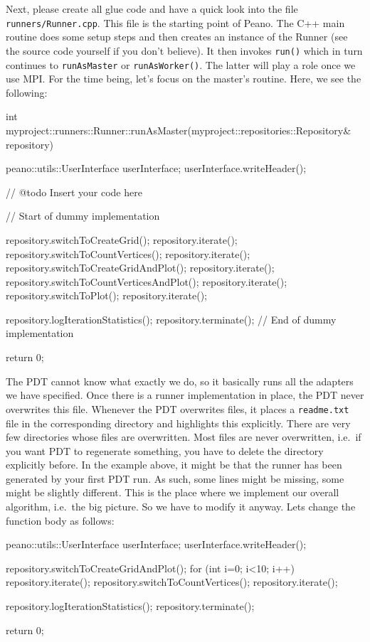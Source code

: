 \noindent
Next, please create all glue code and have a quick look into the file
\texttt{runners/Runner.cpp}.
This file is the starting point of Peano.
The C++ main routine does some setup steps and then creates an instance of the
Runner (see the source code yourself if you don't believe).
It then invokes \texttt{run()} which in turn continues to \texttt{runAsMaster}
or \texttt{runAsWorker()}.
The latter will play a role once we use MPI.
For the time being, let's focus on the master's routine.
Here, we see the following:

\begin{code}
int myproject::runners::Runner::runAsMaster(myproject::repositories::Repository& repository) {
  peano::utils::UserInterface userInterface;
  userInterface.writeHeader();

  // @todo Insert your code here
  
  // Start of dummy implementation
  
  repository.switchToCreateGrid(); repository.iterate();
  repository.switchToCountVertices(); repository.iterate();
  repository.switchToCreateGridAndPlot(); repository.iterate();
  repository.switchToCountVerticesAndPlot(); repository.iterate();
  repository.switchToPlot(); repository.iterate();
 
  repository.logIterationStatistics();
  repository.terminate();
  // End of dummy implementation

  return 0;
}
\end{code}

\noindent
The PDT cannot know what exactly we do, so it basically runs all the adapters we
have specified.
Once there is a runner implementation in place, the PDT never overwrites this
file.
Whenever the PDT overwrites files, it places a \texttt{readme.txt} file in the
corresponding directory and highlights this explicitly.
There are very few directories whose files are overwritten.
Most files are never overwritten, i.e.~if you want PDT to regenerate something,
you have to delete the directory explicitly before.
In the example above, it might be that the runner has been generated by your
first PDT run.
As such, some lines might be missing, some might be slightly different.
This is the place where we implement our overall algorithm,
i.e.~the big picture.
So we have to modify it anyway.
Lets change the function body as follows:

\begin{code}
  peano::utils::UserInterface userInterface;
  userInterface.writeHeader();

  repository.switchToCreateGridAndPlot();
  for (int i=0; i<10; i++) repository.iterate();
  repository.switchToCountVertices(); repository.iterate();

  repository.logIterationStatistics();
  repository.terminate();

  return 0;
\end{code}

